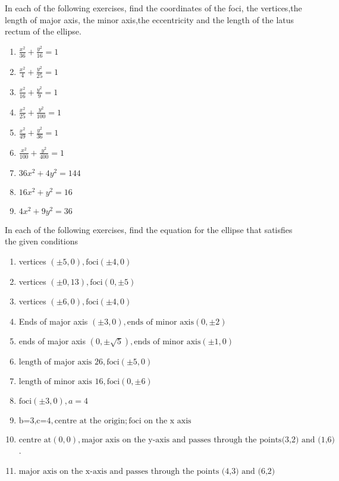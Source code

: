 In each of the following exercises, find the coordinates of the foci, the vertices,the length of major axis, the minor axis,the eccentricity and the length of the latus rectum of the ellipse.
\begin{enumerate}[label=\thesection.\arabic*,ref=\thesection.\theenumi]


  \item $\frac{x^2}{36}+\frac{y^2}{16}=1$
\\
\solution

  \item $\frac{x^2}{4}+\frac{y^2}{25}=1$
\\
\solution

  \item $\frac{x^2}{16}+\frac{y^2}{9}=1$
\\
\solution

  \item $\frac{x^2}{25}+\frac{y^2}{100}=1$
  \item $\frac{x^2}{49}+\frac{y^2}{36}=1$
  \item $\frac{x^2}{100}+\frac{y^2}{400}=1$
  \item $36x^2+4y^2=144$
  \item $16x^2+y^2=16$
  \item $4x^2+9y^2=36$
\end{enumerate}

In each of the following exercises,  find the equation for the ellipse that satisfies the given conditions

\begin{enumerate}[resume*]
\item vertices $(\pm5,0),\text{foci} (\pm4,0)$
\item vertices $(\pm0,13),\text{foci} (0,\pm5)$
\item vertices $(\pm6,0),\text{foci} (\pm4,0)$
\item Ends of major axis $(\pm3,0),\text{ends of minor axis}(0,\pm2)$
\item  ends of major axis $(0,\pm \sqrt{5}),\text{ends of minor axis} (\pm1,0)$
\item $\text {length of major axis 26},\text{foci} (\pm5,0)$
\item $\text {length of minor axis 16},\text{foci} (0,\pm6)$
\item $\text {foci} (\pm3,0),a=4$
\item $\text {b=3,c=4},\text {centre at the origin} ;\text{foci on the x axis}$
\item $\text {centre at} (0,0),\text{major axis on the y-axis and passes through the points} \text {(3,2) and (1,6)}$.
\\
\solution

\item $\text{major axis on the x-axis and passes through the points (4,3) and (6,2)}$
\\
\solution


\end{enumerate}
